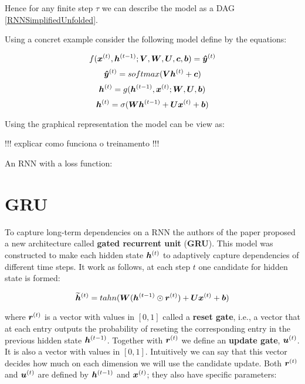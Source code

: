 Hence for any finite step $\tau$ we can describe the model as a DAG \ref{RNNSimplifiedUnfolded}.


Using a concret example consider the following model define by the equations:

\begin{equation}
f(\bm{x}^{(t)}, \bm{h}^{(t-1)}; \bm{V}, \bm{W}, \bm{U}, \bm{c}, \bm{b}) = \bm{\hat{y}}^{(t)}
\end{equation}
 \vspace{0.2cm}
\begin{equation}
\bm{\hat{y}}^{(t)} = softmax(\bm{V} \bm{h}^{(t)} + \bm{c})
\end{equation}
\vspace{0.2cm}
 \begin{equation}
\bm{h}^{(t)} = g(\bm{h}^{(t-1)}, \bm{x}^{(t)}; \bm{W},\bm{U}, \bm{b})
\end{equation}
\vspace{0.2cm}
\begin{equation}
\bm{h}^{(t)} = \sigma(\bm{W} \bm{h}^{(t-1)} + \bm{U} \bm{x}^{(t)} + \bm{b})
\end{equation}

Using the graphical representation the model can be view as:


!!! explicar como funciona o treinamento !!!

An RNN with a loss function:



\section{GRU}
\label{sec:GRU}


To capture long-term dependencies on a RNN  the authors of the paper \cite{ChungGCB14}  proposed a new architecture called \textbf{gated recurrent unit} (\textbf{GRU}). This model was constructed to make each hidden state  $\bm{h}^{(t)}$ to adaptively capture dependencies of different time steps. It work as follows, at each step $t$ one candidate for hidden state is formed:

\begin{equation}
\bm{\widetilde{h}}^{(t)} = tahn(\bm{W} (\bm{h}^{(t-1)} \odot  \bm{r}^{(t)}) + \bm{U} \bm{x}^{(t)} + \bm{b})
\end{equation}


where $\bm{r}^{(t)}$ is a vector with values in $[0, 1]$ called a \textbf{reset gate}, i.e.,  a vector that at each entry outputs the probability of reseting the  corresponding entry in the previous hidden state $\bm{h}^{(t-1)}$. Together with $\bm{r}^{(t)}$ we define an \textbf{update gate}, $\bm{u}^{(t)}$. It is also a vector with values in $[0, 1]$. Intuitively we can say that this vector decides how much on each dimension we will use the candidate update. Both $\bm{r}^{(t)}$ and $\bm{u}^{(t)}$ are defined by $\bm{h}^{(t-1)}$ and $\bm{x}^{(t)}$; they also have specific parameters:

